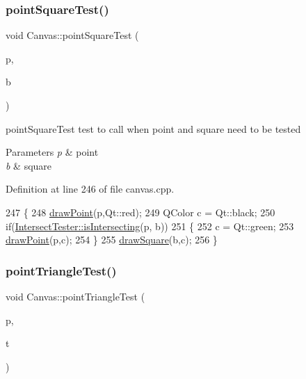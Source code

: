 \subsubsection{\texorpdfstring{point\+Square\+Test()}{pointSquareTest()}}
{\footnotesize\ttfamily void Canvas\+::point\+Square\+Test (\begin{DoxyParamCaption}\item[{\hyperlink{class_point}{Point}}]{p,  }\item[{\hyperlink{class_a_a_b_b}{A\+A\+BB}}]{b }\end{DoxyParamCaption})\hspace{0.3cm}{\ttfamily [private]}}



point\+Square\+Test test to call when point and square need to be tested 


\begin{DoxyParams}{Parameters}
{\em p} & point \\
\hline
{\em b} & square \\
\hline
\end{DoxyParams}


Definition at line 246 of file canvas.\+cpp.


\begin{DoxyCode}
247 \{
248     \hyperlink{class_canvas_ad7cf8e6e93765586808ac744d888dbdc}{drawPoint}(p,Qt::red);
249     QColor c = Qt::black;
250     \textcolor{keywordflow}{if}(\hyperlink{class_intersect_tester_a7710e17ff7d2e229059f23b9429213f5}{IntersectTester::isIntersecting}(p, b))
251     \{
252         c = Qt::green;
253         \hyperlink{class_canvas_ad7cf8e6e93765586808ac744d888dbdc}{drawPoint}(p,c);
254     \}
255     \hyperlink{class_canvas_a78ce810ea0004c4f3fa9ee9d92996875}{drawSquare}(b,c);
256 \}
\end{DoxyCode}
\mbox{\label{class_canvas_a8c35a24d67af6d8a76be14321c08b7cb}} 
\subsubsection{\texorpdfstring{point\+Triangle\+Test()}{pointTriangleTest()}}
{\footnotesize\ttfamily void Canvas\+::point\+Triangle\+Test (\begin{DoxyParamCaption}\item[{\hyperlink{class_point}{Point}}]{p,  }\item[{\hyperlink{class_triangle}{Triangle}}]{t }\end{DoxyParamCaption})\hspace{0.3cm}{\ttfamily [private]}}



